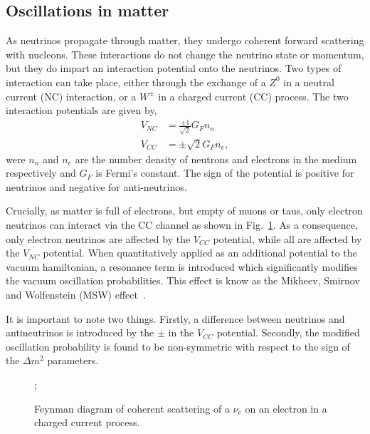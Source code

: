 \subsection{Oscillations in matter} %
\label{sec:theory_oscillations_matter} %

As neutrinos propagate through matter, they undergo coherent forward scattering with nucleons.
These interactions do not change the neutrino state or momentum, but they do impart an interaction
potential onto the neutrinos. Two types of interaction can take place, either through the exchange
of a $Z^{0}$ in a neutral current (NC) interaction, or a $W^{\pm}$ in a charged current (CC)
process. The two interaction potentials are given by,
\begin{align} %
    V_{NC} & = \frac{\pm 1}{\sqrt{2}}G_{F}n_{n} \\
    V_{CC} & = \pm\sqrt{2}G_{F}n_{e},
\end{align}
were $n_{n}$ and $n_{e}$ are the number density of neutrons and electrons in the medium
respectively and $G_{F}$ is Fermi's constant. The sign of the potential is positive for neutrinos
and negative for anti-neutrinos.

Crucially, as matter is full of electrons, but empty of muons or taus, only electron neutrinos can
interact via the CC channel as shown in Fig.~\ref{fig:coherent_scattering}. As a consequence, only
electron neutrinos are affected by the $V_{CC}$ potential, while all are affected by the $V_{NC}$
potential. When quantitatively applied as an additional potential to the vacuum hamiltonian, a
resonance term is introduced which significantly modifies the vacuum oscillation probabilities.
This effect is know as the Mikheev, Smirnov and Wolfenstein (MSW) effect~\cite{wolfenstein1978,
    mikheev1986}.

It is important to note two things. Firstly, a difference between neutrinos and antineutrinos is
introduced by the $\pm$ in the $V_{CC}$ potential. Secondly, the modified oscillation probability
is found to be non-symmetric with respect to the sign of the $\Delta m^{2}$ parameters.

\begin{figure} %
    ;
    \caption[$\nu_{e}$ coherent scattering Feynman diagram]
    {Feynman diagram of coherent scattering of a $\nu_{e}$ on an electron in a charged current
        process.}
    \label{fig:coherent_scattering}
\end{figure}

